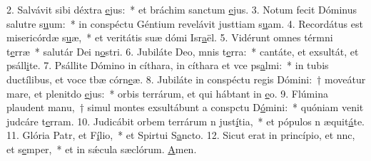 2. Salvávit sibi déxtra \uline{e}jus:~* et bráchim sanctum \uline{e}jus.
3. Notum fecit Dóminus salutre s\uline{u}um:~* in conspéctu Géntium revelávit justtiam s\uline{u}am.
4. Recordátus est misericórdæ s\uline{u}æ,~* et veritátis suæ dómi Isr\uline{a}ël.
5. Vidérunt omnes térmni t\uline{e}rræ~* salutár Dei n\uline{o}stri.
6. Jubiláte Deo, mnis t\uline{e}rra:~* cantáte, et exsultát, et psáll\uline{i}te.
7. Psállite Dómino in cíthara, in cíthara et vce ps\uline{a}lmi:~* in tubis ductílibus, et voce tbæ córn\uline{e}æ.
8. Jubiláte in conspéctu regis Dómini:~† moveátur mare, et plenitdo \uline{e}jus:~* orbis terrárum, et qui hábtant in \uline{e}o.
9. Flúmina plaudent manu,~† simul montes exsultábunt a conspctu D\uline{ó}mini:~* quóniam venit judcáre t\uline{e}rram.
10. Judicábit orbem terrárum n just\uline{í}tia,~* et pópulos n æquit\uline{á}te.
11. Glória Patr, et F\uline{í}lio,~* et Spirtui S\uline{a}ncto.
12. Sicut erat in princípio, et nnc, et s\uline{e}mper,~* et in sǽcula sæclórum. \uline{A}men.
